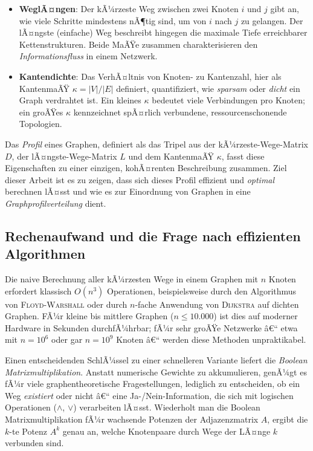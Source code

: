 ﻿\documentclass[a4paper,12pt]{article}
\theoremstyle{definition}
\begin{document}
	\begin{itemize}
		\item[-] \textbf{WeglÃ¤ngen}: Der kÃ¼rzeste Weg zwischen zwei Knoten $i$ und $j$ gibt an, wie viele Schritte mindestens nÃ¶tig sind, um von $i$ nach $j$ zu gelangen. Der lÃ¤ngste (einfache) Weg beschreibt hingegen die maximale Tiefe erreichbarer Kettenstrukturen. Beide MaÃŸe zusammen charakterisieren den \emph{Informationsfluss} in einem Netzwerk.
		\item[-] \textbf{Kantendichte}: Das VerhÃ¤ltnis von Knoten- zu Kantenzahl, hier als KantenmaÃŸ $\kappa = |V| / |E|$ definiert, quantifiziert, wie \emph{sparsam} oder \emph{dicht} ein Graph verdrahtet ist. Ein kleines $\kappa$ bedeutet viele Verbindungen pro Knoten; ein groÃŸes $\kappa$ kennzeichnet spÃ¤rlich verbundene, ressourcenschonende Topologien.
	\end{itemize}

	Das \emph{Profil} eines Graphen, definiert als das Tripel aus der kÃ¼rzeste-Wege-Matrix $D$, der lÃ¤ngste-Wege-Matrix $L$ und dem KantenmaÃŸ $\kappa$, fasst diese Eigenschaften zu einer einzigen, kohÃ¤renten Beschreibung zusammen. Ziel dieser Arbeit ist es zu zeigen, dass sich dieses Profil effizient und \emph{optimal} berechnen lÃ¤sst und wie es zur Einordnung von Graphen in eine \emph{Graphprofilverteilung} dient.

	\subsection{Rechenaufwand und die Frage nach effizienten Algorithmen}

	Die naive Berechnung aller kÃ¼rzesten Wege in einem Graphen mit $n$ Knoten erfordert klassisch $O(n^3)$ Operationen, beispielsweise durch den Algorithmus von \textsc{Floyd-Warshall} oder durch $n$-fache Anwendung von \textsc{Dijkstra} auf dichten Graphen. FÃ¼r kleine bis mittlere Graphen ($n \leq 10{.}000$) ist dies auf moderner Hardware in Sekunden durchfÃ¼hrbar; fÃ¼r sehr groÃŸe Netzwerke â€“ etwa mit $n = 10^6$ oder gar $n = 10^9$ Knoten â€“ werden diese Methoden unpraktikabel.

	Einen entscheidenden SchlÃ¼ssel zu einer schnelleren Variante liefert die \emph{Boolean Matrixmultiplikation}. Anstatt numerische Gewichte zu akkumulieren, genÃ¼gt es fÃ¼r viele graphentheoretische Fragestellungen, lediglich zu entscheiden, ob ein Weg \emph{existiert} oder nicht â€“ eine Ja-/Nein-Information, die sich mit logischen Operationen ($\wedge$, $\vee$) verarbeiten lÃ¤sst. Wiederholt man die Boolean Matrixmultiplikation fÃ¼r wachsende Potenzen der Adjazenzmatrix $A$, ergibt die $k$-te Potenz $A^k$ genau an, welche Knotenpaare durch Wege der LÃ¤nge $k$ verbunden sind.
\end{document}
